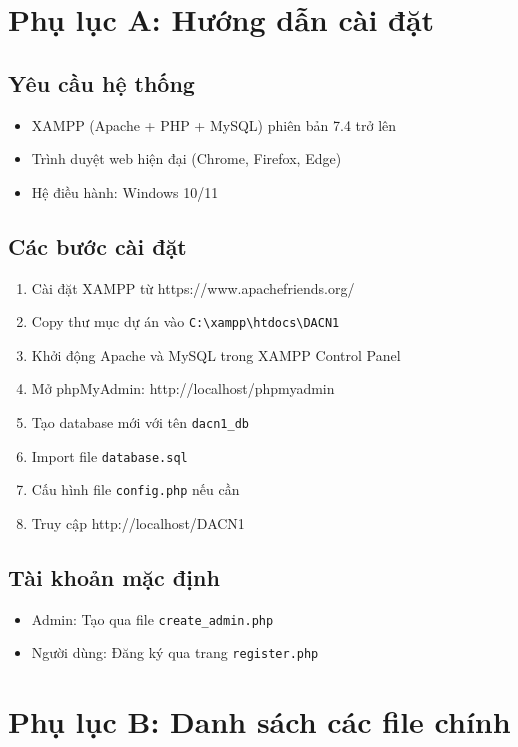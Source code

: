 \documentclass[a4paper,12pt]{report}
\begin{document}
\section*{Phụ lục A: Hướng dẫn cài đặt}

\subsection*{Yêu cầu hệ thống}
\begin{itemize}
    \item XAMPP (Apache + PHP + MySQL) phiên bản 7.4 trở lên
    \item Trình duyệt web hiện đại (Chrome, Firefox, Edge)
    \item Hệ điều hành: Windows 10/11
\end{itemize}

\subsection*{Các bước cài đặt}
\begin{enumerate}
    \item Cài đặt XAMPP từ https://www.apachefriends.org/
    \item Copy thư mục dự án vào \texttt{C:\textbackslash xampp\textbackslash htdocs\textbackslash DACN1}
    \item Khởi động Apache và MySQL trong XAMPP Control Panel
    \item Mở phpMyAdmin: http://localhost/phpmyadmin
    \item Tạo database mới với tên \texttt{dacn1\_db}
    \item Import file \texttt{database.sql}
    \item Cấu hình file \texttt{config.php} nếu cần
    \item Truy cập http://localhost/DACN1
\end{enumerate}

\subsection*{Tài khoản mặc định}
\begin{itemize}
    \item Admin: Tạo qua file \texttt{create\_admin.php}
    \item Người dùng: Đăng ký qua trang \texttt{register.php}
\end{itemize}

\section*{Phụ lục B: Danh sách các file chính}
\end{document}
